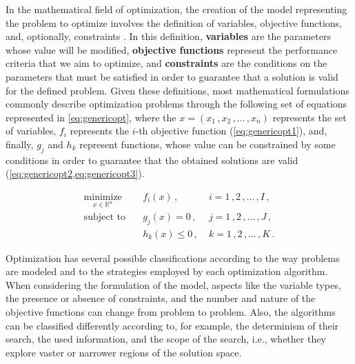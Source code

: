 	
In the mathematical field of optimization, the creation of the model representing the problem to optimize involves the definition of variables, objective functions, and, optionally, constraints \cite{Nocedal2011NumericalOptimization}. In this definition, \textbf{variables} are the parameters whose value will be modified, \textbf{objective functions} represent the performance criteria that we aim to optimize, and \textbf{constraints} are the conditions on the parameters that must be satisfied in order to guarantee that a solution is valid for the defined problem. Given these definitions, most mathematical formulations commonly describe optimization problems through the following set of equations represented in \cref{eq:genericopt}\cite{Koziel2011}, where the $x = (x_1\,, x_2\,, \ldots\,, x_n)$ represents the set of variables, $f_i$ represents the $i$-th objective function (\cref{eq:genericopt1}), and, finally, $g_j$ and $h_k$ represent functions, whose value can be constrained by some conditions in order to guarantee that the obtained solutions are valid (\cref{eq:genericopt2,eq:genericopt3}). 
	
	\begin{subequations}
		\label{eq:genericopt}
		\begin{align}
		\underset{x \in \mathbb{R}^n}{\text{minimize}}
		& \quad f_i(x)\,, &\; i = 1\,, 2\,, \ldots\,, I\,, 
		\label{eq:genericopt1}\\
		\text{subject to}
		& \quad g_j(x) = 0\,, &\; j = 1\,, 2\,, \ldots\,, J\,, \label{eq:genericopt2}\\ 
		& \quad h_k(x) \leq 0\,, &\; k = 1\,, 2\,, \ldots\,, K\,.  \label{eq:genericopt3}
		\end{align}
	\end{subequations}
	
	Optimization has several possible classifications according to the way problems are modeled and to the strategies employed by each optimization algorithm. When considering the formulation of the model, aspects like the variable types, the presence or absence of constraints, and the number and nature of the objective functions can change from problem to problem. Also, the algorithms can be classified differently according to, for example, the determinism of their search, the used information, and the scope of the search, i.e., whether they explore vaster or narrower regions of the solution space. 
	
